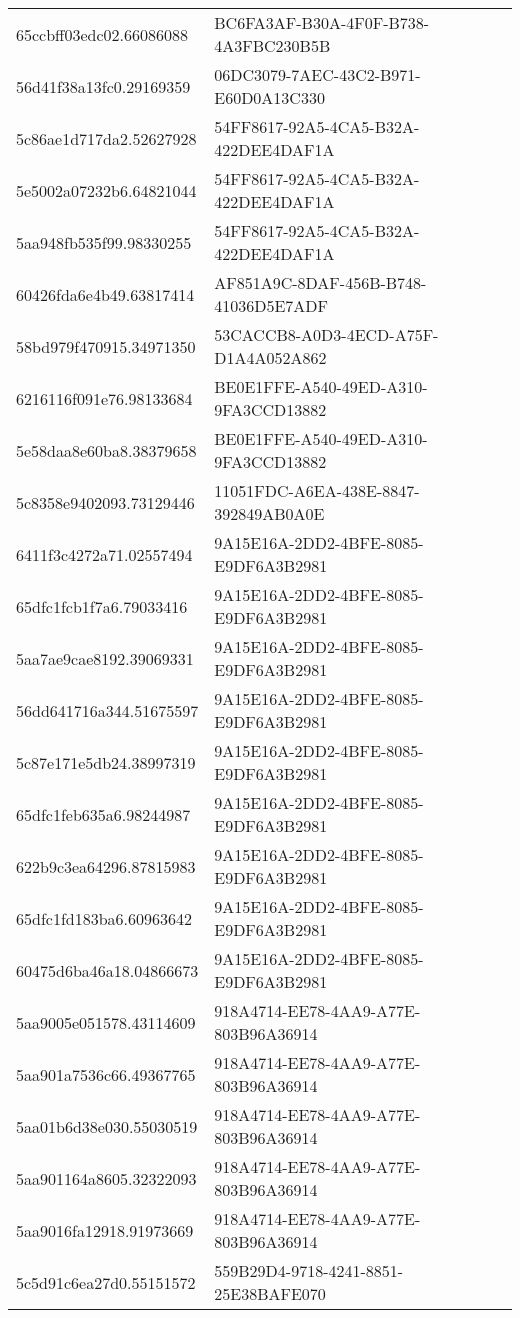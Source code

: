 \begin{tabular}{ll}
65ccbff03edc02.66086088 & BC6FA3AF-B30A-4F0F-B738-4A3FBC230B5B \\
56d41f38a13fc0.29169359 & 06DC3079-7AEC-43C2-B971-E60D0A13C330 \\
5c86ae1d717da2.52627928 & 54FF8617-92A5-4CA5-B32A-422DEE4DAF1A \\
5e5002a07232b6.64821044 & 54FF8617-92A5-4CA5-B32A-422DEE4DAF1A \\
5aa948fb535f99.98330255 & 54FF8617-92A5-4CA5-B32A-422DEE4DAF1A \\
60426fda6e4b49.63817414 & AF851A9C-8DAF-456B-B748-41036D5E7ADF \\
58bd979f470915.34971350 & 53CACCB8-A0D3-4ECD-A75F-D1A4A052A862 \\
6216116f091e76.98133684 & BE0E1FFE-A540-49ED-A310-9FA3CCD13882 \\
5e58daa8e60ba8.38379658 & BE0E1FFE-A540-49ED-A310-9FA3CCD13882 \\
5c8358e9402093.73129446 & 11051FDC-A6EA-438E-8847-392849AB0A0E \\
6411f3c4272a71.02557494 & 9A15E16A-2DD2-4BFE-8085-E9DF6A3B2981 \\
65dfc1fcb1f7a6.79033416 & 9A15E16A-2DD2-4BFE-8085-E9DF6A3B2981 \\
5aa7ae9cae8192.39069331 & 9A15E16A-2DD2-4BFE-8085-E9DF6A3B2981 \\
56dd641716a344.51675597 & 9A15E16A-2DD2-4BFE-8085-E9DF6A3B2981 \\
5c87e171e5db24.38997319 & 9A15E16A-2DD2-4BFE-8085-E9DF6A3B2981 \\
65dfc1feb635a6.98244987 & 9A15E16A-2DD2-4BFE-8085-E9DF6A3B2981 \\
622b9c3ea64296.87815983 & 9A15E16A-2DD2-4BFE-8085-E9DF6A3B2981 \\
65dfc1fd183ba6.60963642 & 9A15E16A-2DD2-4BFE-8085-E9DF6A3B2981 \\
60475d6ba46a18.04866673 & 9A15E16A-2DD2-4BFE-8085-E9DF6A3B2981 \\
5aa9005e051578.43114609 & 918A4714-EE78-4AA9-A77E-803B96A36914 \\
5aa901a7536c66.49367765 & 918A4714-EE78-4AA9-A77E-803B96A36914 \\
5aa01b6d38e030.55030519 & 918A4714-EE78-4AA9-A77E-803B96A36914 \\
5aa901164a8605.32322093 & 918A4714-EE78-4AA9-A77E-803B96A36914 \\
5aa9016fa12918.91973669 & 918A4714-EE78-4AA9-A77E-803B96A36914 \\
5c5d91c6ea27d0.55151572 & 559B29D4-9718-4241-8851-25E38BAFE070 \\

\end{tabular}
